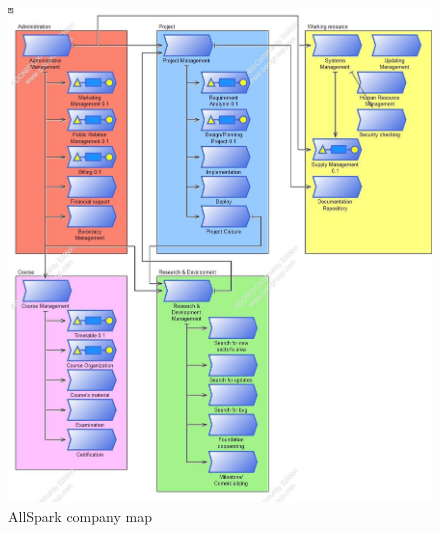 \begin{figure}
\begin{centering}
\includegraphics[scale=0.40]{assign2/adonis/imgs/companymap.jpg}
\caption{AllSpark company map}
\label{2img:cmap}
\end{centering}
\end{figure}


